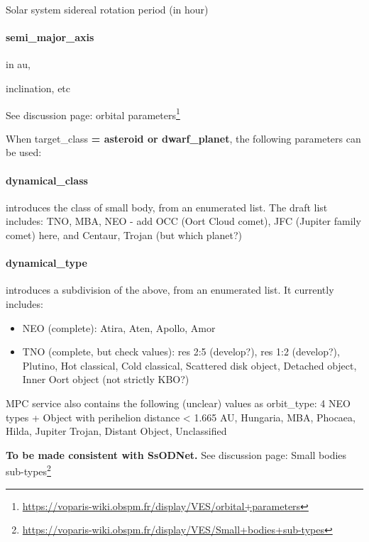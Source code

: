 \documentclass[11pt,a4paper]{ivoa}
\begin{document}
Solar system sidereal rotation period (in hour)

\paragraph{semi\_major\_axis}

in au,

inclination, etc

See discussion page: orbital parameters\footnote{\url{https://voparis-wiki.obspm.fr/display/VES/orbital+parameters}}


When target\_class\textbf{ = asteroid or dwarf\_planet}, the following parameters can be used:\textbf{\\}

\paragraph{dynamical\_class}

introduces the class of small body, from an enumerated list. The draft list includes: TNO, MBA, NEO - add OCC (Oort Cloud comet), JFC (Jupiter family comet) here, and Centaur, Trojan (but which planet?)

\paragraph{dynamical\_type}

introduces a subdivision of the above, from an enumerated list. It currently includes:

\begin{itemize}

\item NEO (complete): Atira, Aten, Apollo, Amor

\item TNO (complete, but check values): res 2:5 (develop?), res 1:2 (develop?), Plutino, Hot classical, Cold classical, Scattered disk object, Detached object, Inner Oort object (not strictly KBO?)

\end{itemize}

MPC service also contains the following (unclear) values as orbit\_type: 4 NEO types + Object with perihelion distance < 1.665 AU, Hungaria, MBA, Phocaea, Hilda, Jupiter Trojan, Distant Object, Unclassified


\textbf{To be made consistent with SsODNet. }See discussion page: Small bodies sub-types\footnote{\url{https://voparis-wiki.obspm.fr/display/VES/Small+bodies+sub-types}}
\end{document}
